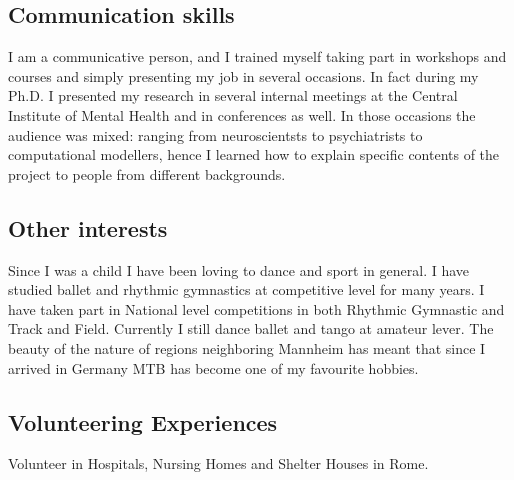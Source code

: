 \documentclass[letterpaper]{twentysecondcv} %
\begin{document}
\subsection{Communication skills}
I am a communicative person, and I trained myself taking part in workshops and courses and simply presenting my job in several occasions. In fact during my Ph.D. I presented my research in several internal meetings at the Central Institute of Mental Health and in conferences as well.
In those occasions the audience was mixed: ranging from neuroscientsts to psychiatrists to computational modellers, hence I learned how to explain specific contents of the project to people from different backgrounds.\\



\subsection{Other interests} 
Since I was a child I have been loving to dance and sport in general. I have studied ballet and rhythmic gymnastics at competitive level for many years. I have taken part in National level competitions in both Rhythmic Gymnastic and Track and Field. Currently I still dance ballet and tango at amateur lever. The beauty of the nature of regions neighboring Mannheim has meant that since I arrived in Germany MTB has become one of my favourite hobbies.

\subsection{Volunteering Experiences}
Volunteer in Hospitals, Nursing Homes and Shelter Houses in Rome.
\end{document}
